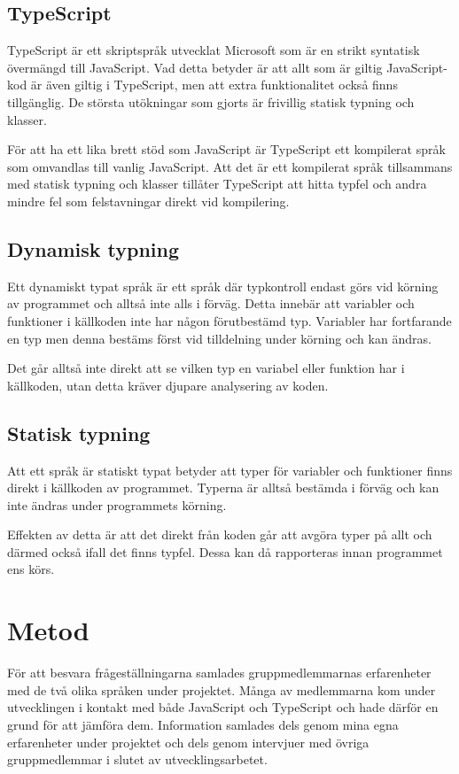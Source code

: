 \subsection{TypeScript}
TypeScript är ett skriptspråk utvecklat Microsoft som är en strikt syntatisk övermängd till JavaScript. \cite{henrik_ts1} Vad detta betyder är att allt som är giltig JavaScript-kod är även giltig i TypeScript, men att extra funktionalitet också finns tillgänglig. De största utökningar som gjorts är frivillig statisk typning och klasser.

För att ha ett lika brett stöd som JavaScript är TypeScript ett kompilerat språk som omvandlas till vanlig JavaScript. Att det är ett kompilerat språk tillsammans med statisk typning och klasser tillåter TypeScript att hitta typfel och andra mindre fel som felstavningar direkt vid kompilering.
\subsection{Dynamisk typning}
Ett dynamiskt typat språk är ett språk där typkontroll endast görs vid körning av programmet och alltså inte alls i förväg. Detta innebär att variabler och funktioner i källkoden inte har någon förutbestämd typ. Variabler har fortfarande en typ men denna bestäms först vid tilldelning under körning och kan ändras.

Det går alltså inte direkt att se vilken typ en variabel eller funktion har i källkoden, utan detta kräver djupare analysering av koden.
\subsection{Statisk typning}
Att ett språk är statiskt typat betyder att typer för variabler och funktioner finns direkt i källkoden av programmet. Typerna är alltså bestämda i förväg och kan inte ändras under programmets körning.

Effekten av detta är att det direkt från koden går att avgöra typer på allt och därmed också ifall det finns typfel. Dessa kan då rapporteras innan programmet ens körs.
\section{Metod}
För att besvara frågeställningarna samlades gruppmedlemmarnas erfarenheter med de två olika språken under projektet. Många av medlemmarna kom under utvecklingen i kontakt med både JavaScript och TypeScript och hade därför en grund för att jämföra dem. Information samlades dels genom mina egna erfarenheter under projektet och dels genom intervjuer med övriga gruppmedlemmar i slutet av utvecklingsarbetet.

